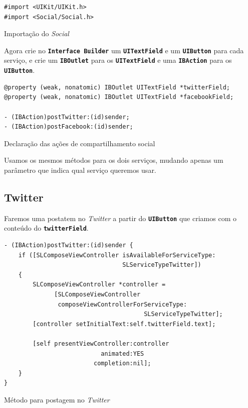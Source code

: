 \documentclass[a4paper,12pt,brazil,oneside]{book}
\begin{document}
\begin{listing}[H]
\begin{verbatim}
#import <UIKit/UIKit.h>
#import <Social/Social.h>
\end{verbatim}
\caption{Importação do \emph{Social}}
\end{listing}


Agora crie no \texttt{\textbf{Interface Builder}} um \texttt{\textbf{UITextField}} e um \texttt{\textbf{UIButton}} para cada serviço, e crie um \texttt{\textbf{IBOutlet}} para os \texttt{\textbf{UITextField}} e uma \texttt{\textbf{IBAction}} para os \texttt{\textbf{UIButton}}.

\begin{listing}[H]
\begin{verbatim}
@property (weak, nonatomic) IBOutlet UITextField *twitterField;
@property (weak, nonatomic) IBOutlet UITextField *facebookField;

- (IBAction)postTwitter:(id)sender;
- (IBAction)postFacebook:(id)sender;
\end{verbatim}
\caption{Declaração das ações de compartilhamento social}
\end{listing}


Usamos os mesmos métodos para os dois serviços, mudando apenas um parâmetro que indica qual serviço queremos usar.

\subsection{Twitter}


Faremos uma postatem no \emph{Twitter} a partir do \texttt{\textbf{UIButton}} que criamos com o conteúdo do \texttt{\textbf{twitterField}}. 

\begin{listing}[H]
\begin{verbatim}
- (IBAction)postTwitter:(id)sender {
    if ([SLComposeViewController isAvailableForServiceType:
                                 SLServiceTypeTwitter])
    {
        SLComposeViewController *controller = 
              [SLComposeViewController
               composeViewControllerForServiceType:
                                       SLServiceTypeTwitter];
        [controller setInitialText:self.twitterField.text];
        
        [self presentViewController:controller
                           animated:YES
                         completion:nil];
    }
}
\end{verbatim}
\caption{Método para postagem no \emph{Twitter}}
\end{listing}
\end{document}
